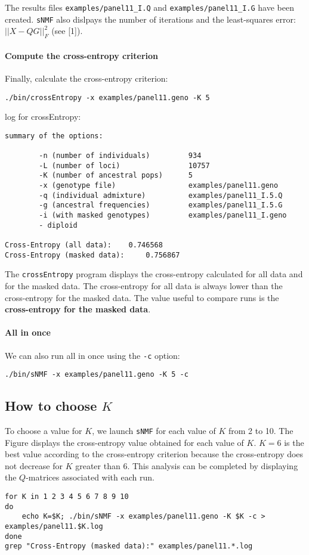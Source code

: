 \documentclass[10pt,a4paper]{article}
\begin{document}
\noindent
The results files \verb|examples/panel11_I.Q| and \verb|examples/panel11_I.G| have been created.
{\tt sNMF} also dislpays the number of iterations and the least-squares error: $||X - QG||_F^2$
(see [1]).

\paragraph{Compute the cross-entropy criterion}

Finally, calculate the cross-entropy criterion:
\begin{Verbatim}[frame=single]
./bin/crossEntropy -x examples/panel11.geno -K 5
\end{Verbatim}
\noindent
log for crossEntropy:
\begin{Verbatim}[frame=single]
summary of the options:

        -n (number of individuals)         934
        -L (number of loci)                10757
        -K (number of ancestral pops)      5
        -x (genotype file)                 examples/panel11.geno
        -q (individual admixture)          examples/panel11_I.5.Q
        -g (ancestral frequencies)         examples/panel11_I.5.G
        -i (with masked genotypes)         examples/panel11_I.geno
        - diploid

Cross-Entropy (all data):	 0.746568
Cross-Entropy (masked data):	 0.756867
\end{Verbatim}
\noindent
The {\tt crossEntropy} program displays the cross-entropy calculated for all data and for the masked data.
The cross-entropy for all data is always lower than the cross-entropy for the masked data. 
The value useful to compare runs is the {\bf cross-entropy for the masked data}.


\paragraph{All in once}
We can also run all in once using the \verb|-c| option:
\begin{Verbatim}[frame=single]
./bin/sNMF -x examples/panel11.geno -K 5 -c
\end{Verbatim}

\subsection{How to choose $K$}

To choose a value for $K$, we launch {\tt sNMF} for each value of $K$ from 2 to 10. The Figure displays the cross-entropy value obtained for each value of $K$. $K=6$ is the best value according to the cross-entropy criterion because the cross-entropy does not decrease for $K$ greater than 6. This analysis can be completed by displaying the $Q$-matrices associated with each run. 
\begin{Verbatim}[frame=single]
for K in 1 2 3 4 5 6 7 8 9 10 
do 
	echo K=$K; ./bin/sNMF -x examples/panel11.geno -K $K -c > examples/panel11.$K.log
done
grep "Cross-Entropy (masked data):" examples/panel11.*.log
\end{Verbatim}
\end{document}

